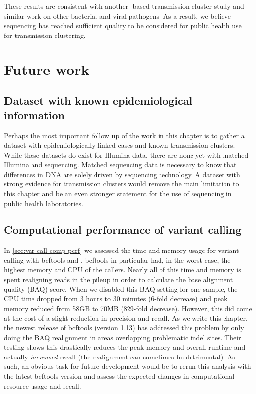 These results are consistent with another \mtb{} \ont{}-based transmission cluster study and similar work on other bacterial and viral pathogens. As a result, we believe \ont{} sequencing has reached sufficient quality to be considered for public health use for transmission clustering.


\section{Future work}

\subsection{Dataset with known epidemiological information}
Perhaps the most important follow up of the work in this chapter is to gather a dataset with epidemiologically linked cases and known transmission clusters. While these datasets do exist for Illumina data, there are none yet with matched Illumina and \ont{} sequencing. Matched sequencing data is necessary to know that differences in DNA are solely driven by sequencing technology. A dataset with strong evidence for transmission clusters would remove the main limitation to this chapter and be an even stronger statement for the use of \ont{} sequencing in public health laboratories.

\subsection{Computational performance of variant calling}
In \autoref{sec:var-call-comp-perf} we assessed the time and memory usage for variant calling with bcftools and \pandora{}. bcftools in particular had, in the worst case, the highest memory and CPU of the callers. Nearly all of this time and memory is spent realigning reads in the pileup in order to calculate the base alignment quality (BAQ) score. When we disabled this BAQ setting for one sample, the CPU time dropped from 3 hours to 30 minutes (6-fold decrease) and peak memory reduced from 58GB to 70MB (829-fold decrease). However, this did come at the cost of a slight reduction in precision and recall. As we write this chapter, the newest release of bcftools (version 1.13) has addressed this problem by only doing the BAQ realignment in areas overlapping problematic indel sites. Their testing shows this drastically reduces the peak memory and overall runtime and actually \emph{increased} recall (the realignment can sometimes be detrimental). As such, an obvious task for future development would be to rerun this analysis with the latest bcftools version and assess the expected changes in computational resource usage and recall.


